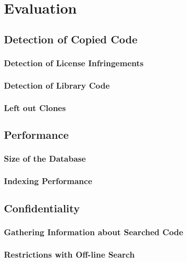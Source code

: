 
\chapter{Evaluation}\label{chapter:evaluation}
\section{Detection of Copied Code} %
\subsection{Detection of License Infringements}
\subsection{Detection of Library Code}
\subsection{Left out Clones}

\section{Performance}
\subsection{Size of the Database}
\subsection{Indexing Performance}

\section{Confidentiality}
\subsection{Gathering Information about Searched Code}
\subsection{Restrictions with Off-line Search}